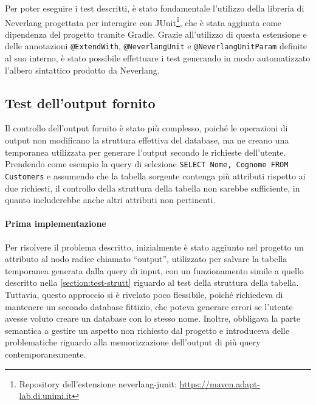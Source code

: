 \documentclass[12pt,a4paper,openright,twoside]{book}
\begin{document}
Per poter eseguire i test descritti, è stato fondamentale l’utilizzo della libreria di Neverlang progettata per interagire con 
JUnit\footnote{Repository dell’estensione neverlang-junit: \href{https://maven.adapt-lab.di.unimi.it/\#/neverlang/releases/it/unimi/di/adaptlab/neverlang-junit-extension}{https://maven.adapt-lab.di.unimi.it}}, 
che è stata aggiunta come dipendenza del progetto tramite Gradle. Grazie all’utilizzo di questa estensione e delle annotazioni 
\texttt{@ExtendWith}, \texttt{@NeverlangUnit} e \texttt{@NeverlangUnitParam} definite al suo interno, è stato possibile effettuare 
i test generando in modo automatizzato l’albero sintattico prodotto da Neverlang.

\subsection{Test dell’output fornito}
Il controllo dell’output fornito è stato più complesso, poiché le operazioni di output non modificano la struttura effettiva del 
database, ma ne creano una temporanea utilizzata per generare l’output secondo le richieste dell’utente. Prendendo come esempio la 
query di selezione \texttt{SELECT Nome, Cognome FROM Customers} e assumendo che la tabella sorgente contenga più attributi 
rispetto ai due richiesti, il controllo della struttura della tabella non sarebbe sufficiente, in quanto includerebbe anche altri 
attributi non pertinenti.

\paragraph{Prima implementazione}
Per risolvere il problema descritto, inizialmente è stato aggiunto nel progetto un attributo al nodo radice chiamato “output”, 
utilizzato per salvare la tabella temporanea generata dalla query di input, con un funzionamento simile a quello descritto nella 
\cref{section:test-strutt} riguardo al test della struttura della tabella. Tuttavia, questo approccio si è rivelato poco flessibile, 
poiché richiedeva di mantenere un secondo database fittizio, che poteva generare errori se l’utente avesse voluto creare un database 
con lo stesso nome. Inoltre, obbligava la parte semantica a gestire un aspetto non richiesto dal progetto e introduceva delle 
problematiche riguardo alla memorizzazione dell’output di più query contemporaneamente.
\end{document}
